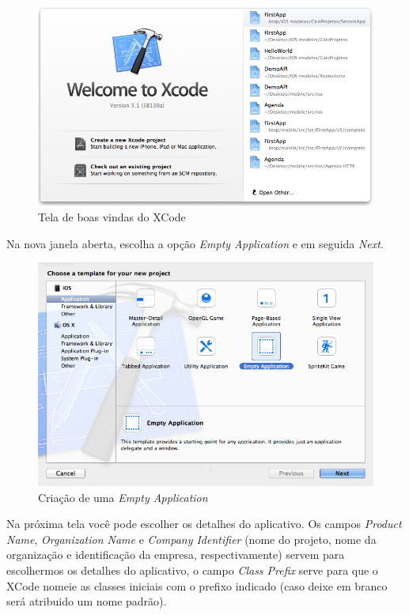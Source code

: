 \documentclass[a4paper,12pt,brazil,oneside]{book}
\begin{document}
\begin{figure}[H]
  \centering
  \includegraphics[width=.75\textwidth]{figuras/3/tela_boas_vindas_xcode.png}
  \caption{Tela de boas vindas do XCode}
  \label{fig:a}
\end{figure}

Na nova janela aberta, escolha a opção \emph{Empty Application} e em seguida \emph{Next}.

\begin{figure}[H]
  \centering
  \includegraphics[width=.75\textwidth]{figuras/3/tela_novo_projeto_1.png}
  \caption{Criação de uma \emph{Empty Application}}
  \label{fig:a}
\end{figure}

Na próxima tela você pode escolher os detalhes do aplicativo. Os campos \emph{Product Name}, \emph{Organization Name} e \emph{Company Identifier} (nome do projeto, nome da organização e identificação da empresa, respectivamente) servem para escolhermos os detalhes do aplicativo, o campo \emph{Class Prefix} serve para que o XCode nomeie as classes iniciais com o prefixo indicado (caso deixe em branco será atribuido um nome padrão).
\end{document}
